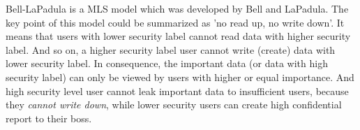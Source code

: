Bell-LaPadula is a MLS model which was developed by Bell and LaPadula.
The key point of this model could be summarized as 'no read up, no write down'.
It means that users with lower security label cannot read data with higher security label.
And so on, a higher security label user cannot write (create) data with lower security label.
In consequence, the important data (or data with high security label) can only be viewed by users with higher or equal importance.
And high security level user cannot leak important data to insufficient users, because they \emph{cannot write down}, while lower security users can create high confidential report to their boss.



